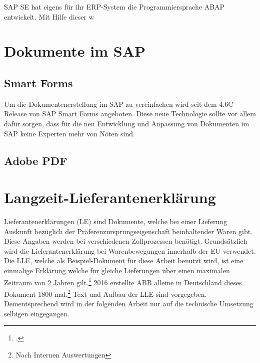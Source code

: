 SAP SE hat eigens für ihr \ac{ERP}-System die Programmiersprache \ac{ABAP} entwickelt. Mit Hilfe dieser w



\section{Dokumente im SAP}
\subsection{Smart Forms}

Um die Dokumentenerstellung im SAP zu vereinfachen wird seit dem 4.6C Release von SAP Smart Forms angeboten. Diese neue Technologie sollte vor allem dafür sorgen, dass für die neu Entwicklung und Anpassung von Dokumenten im SAP keine Experten mehr von Nöten sind.


\subsection{Adobe PDF}




\section{Langzeit-Lieferantenerklärung}

 Lieferantenerklärungen (LE) sind Dokumente, welche bei einer Lieferung Auskunft bezüglich der Präferenzursprungseigenschaft beinhaltender Waren gibt. Diese Angaben werden bei verschiedenen Zollprozessen benötigt. Grundsätzlich wird die Lieferantenerklärung bei Warenbewegungen innerhalb der \ac{EU} verwendet. Die \ac{LLE}, welche als Beispiel-Dokument für diese Arbeit benutzt wird, ist eine einmalige Erklärung welche für gleiche Lieferungen über einen maximalen Zeitraum von 2 Jahren gilt.\footcite{ZOLL.2017} 2016 erstellte ABB alleine in Deutschland dieses Dokument 1800 mal.\footnote{Nach Internen Auswertungen} Text und Aufbau der \ac{LLE} sind vorgegeben. Dementsprechend wird in der folgenden Arbeit nur auf die technische Umsetzung selbigen eingegangen.
